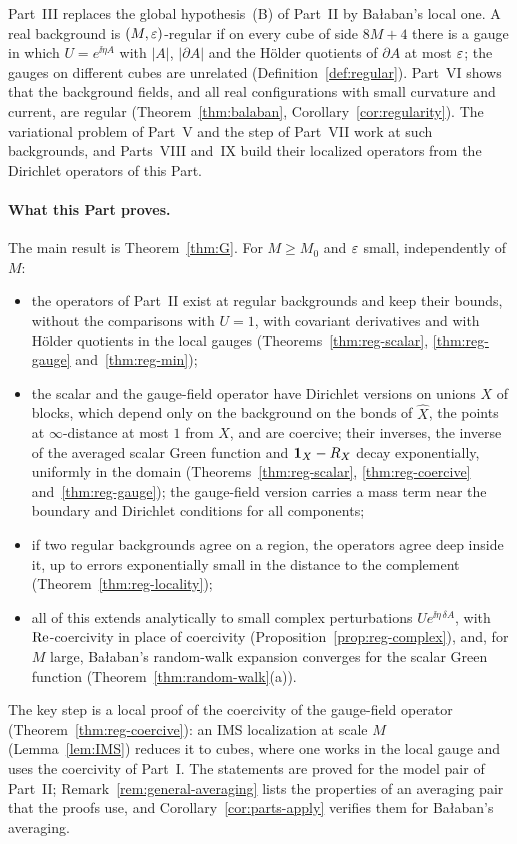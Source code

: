 \label{intro:III}
Part~III replaces the global hypothesis~(B) of Part~II by Ba\l aban's local one. A real background is $(M,\varepsilon)$-regular if on every cube of side $8M+4$ there is a gauge in which $U=e^{\ii\eta A}$ with $|A|$, $|\partial A|$ and the H\"older quotients of $\partial A$ at most $\varepsilon$; the gauges on different cubes are unrelated (Definition~\ref{def:regular}). Part~VI shows that the background fields, and all real configurations with small curvature and current, are regular (Theorem~\ref{thm:balaban}, Corollary~\ref{cor:regularity}). The variational problem of Part~V and the step of Part~VII work at such backgrounds, and Parts~VIII and~IX build their localized operators from the Dirichlet operators of this Part.

\paragraph{What this Part proves.} The main result is Theorem~\ref{thm:G}. For $M\ge M_0$ and $\varepsilon$ small, independently of $M$:
\begin{itemize}
\item the operators of Part~II exist at regular backgrounds and keep their bounds, without the comparisons with $U=1$, with covariant derivatives and with H\"older quotients in the local gauges (Theorems~\ref{thm:reg-scalar}, \ref{thm:reg-gauge} and~\ref{thm:reg-min});
\item the scalar and the gauge-field operator have Dirichlet versions on unions $X$ of blocks, which depend only on the background on the bonds of $\hat X$, the points at $\infty$-distance at most $1$ from $X$, and are coercive; their inverses, the inverse of the averaged scalar Green function and $\mathbf 1_X-R_X$ decay exponentially, uniformly in the domain (Theorems~\ref{thm:reg-scalar}, \ref{thm:reg-coercive} and~\ref{thm:reg-gauge}); the gauge-field version carries a mass term near the boundary and Dirichlet conditions for all components;
\item if two regular backgrounds agree on a region, the operators agree deep inside it, up to errors exponentially small in the distance to the complement (Theorem~\ref{thm:reg-locality});
\item all of this extends analytically to small complex perturbations $Ue^{\ii\eta\,\delta\!A}$, with $\operatorname{Re}$-coercivity in place of coercivity (Proposition~\ref{prop:reg-complex}), and, for $M$ large, Ba\l aban's random-walk expansion converges for the scalar Green function (Theorem~\ref{thm:random-walk}(a)).
\end{itemize}
The key step is a local proof of the coercivity of the gauge-field operator (Theorem~\ref{thm:reg-coercive}): an IMS localization at scale $M$ (Lemma~\ref{lem:IMS}) reduces it to cubes, where one works in the local gauge and uses the coercivity of Part~I. The statements are proved for the model pair of Part~II; Remark~\ref{rem:general-averaging} lists the properties of an averaging pair that the proofs use, and Corollary~\ref{cor:parts-apply} verifies them for Ba\l aban's averaging.


